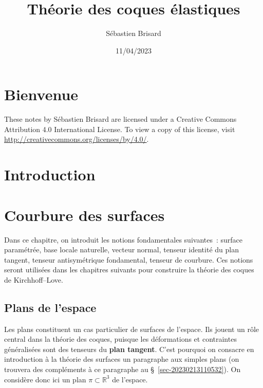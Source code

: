 \documentclass[
  a4paper,
  DIV=11,
  numbers=noendperiod]{scrreprt}
\title{Théorie des coques élastiques}
\author{Sébastien Brisard}
\date{11/04/2023}
\renewcommand*\contentsname{Table des matières}
\newcommand\contentsname{Table des matières}
\begin{document}
\maketitle
\ifdefined\Shaded\renewenvironment{Shaded}{\begin{tcolorbox}[interior hidden, frame hidden, sharp corners, breakable, borderline west={3pt}{0pt}{shadecolor}, enhanced, boxrule=0pt]}{\end{tcolorbox}}\fi

\renewcommand*\contentsname{Table des matières}
{
\hypersetup{linkcolor=}
\setcounter{tocdepth}{2}
\tableofcontents
}

\hypertarget{bienvenue}{%
\chapter{Bienvenue}\label{bienvenue}}

These notes by Sébastien Brisard are licensed under a Creative Commons
Attribution 4.0 International License. To view a copy of this license,
visit \url{http://creativecommons.org/licenses/by/4.0/}.


\hypertarget{introduction}{%
\chapter{Introduction}\label{introduction}}


\hypertarget{courbure-des-surfaces}{%
\chapter{Courbure des surfaces}\label{courbure-des-surfaces}}

Dans ce chapitre, on introduit les notions fondamentales suivantes~:
surface paramétrée, base locale naturelle, vecteur normal, tenseur
identité du plan tangent, tenseur antisymétrique fondamental, tenseur de
courbure. Ces notions seront utilisées dans les chapitres suivants pour
construire la théorie des coques de Kirchhoff--Love.

\hypertarget{sec-20230214053442}{%
\section{Plans de l'espace}\label{sec-20230214053442}}

Les plans constituent un cas particulier de surfaces de l'espace. Ils
jouent un rôle central dans la théorie des coques, puisque les
déformations et contraintes généralisées sont des tenseurs du
\textbf{plan tangent}. C'est pourquoi on consacre en introduction à la
théorie des surfaces un paragraphe aux simples plans (on trouvera des
compléments à ce paragraphe au §~\ref{sec-20230213110532}). On considère
donc ici un plan \(π ⊂ ℝ^3\) de l'espace.
\end{document}
